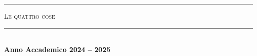 \begin{titlingpage}
\begin{center}
        \vfill
        \centering
        \begin{minipage}[h]{\unictsize}
            \centering
            \hrule
            \vspace{10pt}
            \textsc{Le quattro cose}
            \vspace{10pt}
            \hrule
        \end{minipage}
        \\[50pt]
        \vspace{\fill}
        \vspace{30pt}
        \doublerule
        \vspace{10pt}
        \normalsize
        \textbf{Anno Accademico 2024 -- 2025}
    \end{center}
\end{titlingpage}
\restoregeometry
